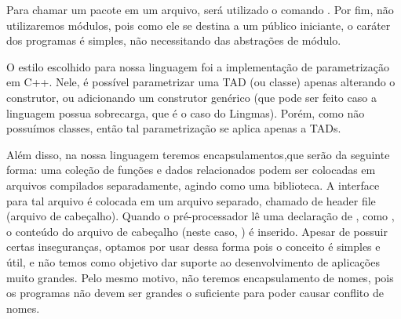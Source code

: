 Para chamar um pacote em um arquivo, será utilizado o comando . Por fim, não utilizaremos módulos, pois como ele se destina
a um público iniciante, o caráter dos programas é simples, não necessitando das
abstrações de módulo.

O estilo escolhido para nossa linguagem foi a implementação de parametrização
em C++. Nele, é possível parametrizar uma TAD (ou classe) apenas alterando o
construtor, ou adicionando um construtor genérico (que pode ser feito caso a
linguagem possua sobrecarga, que é o caso do Lingmas). Porém, como não
possuímos classes, então tal parametrização se aplica apenas a TADs.

Além disso, na nossa linguagem teremos encapsulamentos,que serão da  seguinte
forma: uma coleção de funções e dados relacionados podem ser colocadas em
arquivos compilados separadamente, agindo como uma biblioteca. A interface para
tal arquivo é colocada em um arquivo separado, chamado de header file (arquivo
de cabeçalho).  Quando o pré-processador lê uma declaração de , como
, o conteúdo do arquivo de cabeçalho (neste caso,
) é inserido. Apesar de possuir certas inseguranças, optamos
por usar dessa forma pois o conceito é simples e útil, e não temos como
objetivo dar suporte ao desenvolvimento de aplicações muito grandes. Pelo mesmo
motivo, não teremos encapsulamento de nomes, pois os programas não devem ser
grandes o suficiente para poder causar conflito de nomes.
